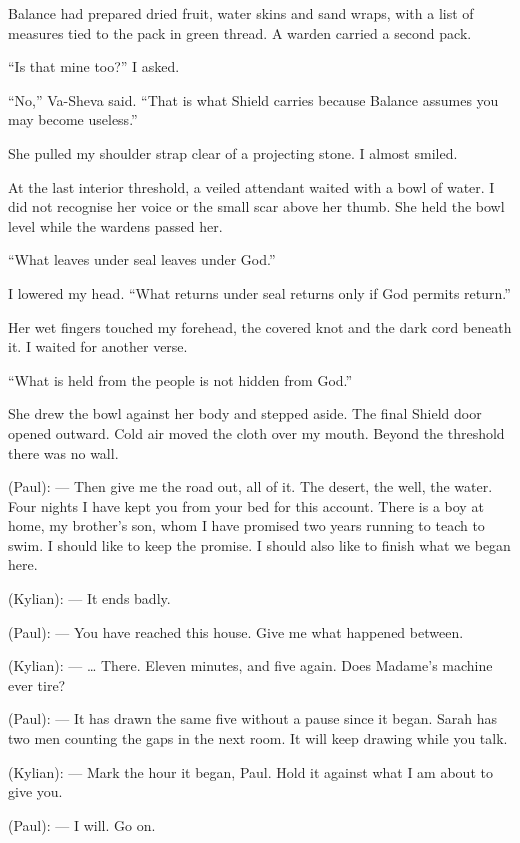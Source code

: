 Balance had prepared dried fruit, water skins and sand wraps, with a list of measures tied to the pack in green thread. A warden carried a second pack.\par

``Is that mine too?'' I asked.\par

``No,'' Va-Sheva said. ``That is what Shield carries because Balance assumes you may become useless.''\par

She pulled my shoulder strap clear of a projecting stone. I almost smiled.\par

At the last interior threshold, a veiled attendant waited with a bowl of water. I did not recognise her voice or the small scar above her thumb. She held the bowl level while the wardens passed her.\par

``What leaves under seal leaves under God.''\par

I lowered my head. ``What returns under seal returns only if God permits return.''\par

Her wet fingers touched my forehead, the covered knot and the dark cord beneath it. I waited for another verse.\par

``What is held from the people is not hidden from God.''\par

She drew the bowl against her body and stepped aside. The final Shield door opened outward. Cold air moved the cloth over my mouth. Beyond the threshold there was no wall.\par

\ornament

\begin{room}

(Paul): --- Then give me the road out, all of it. The desert, the well, the water. Four nights I have kept you from your bed for this account. There is a boy at home, my brother's son, whom I have promised two years running to teach to swim. I should like to keep the promise. I should also like to finish what we began here.

(Kylian): --- It ends badly.

(Paul): --- You have reached this house. Give me what happened between.

(Kylian): --- \ldots{} There. Eleven minutes, and five again. Does Madame's machine ever tire?

(Paul): --- It has drawn the same five without a pause since it began. Sarah has two men counting the gaps in the next room. It will keep drawing while you talk.

(Kylian): --- Mark the hour it began, Paul. Hold it against what I am about to give you.

(Paul): --- I will. Go on.

\end{room}

